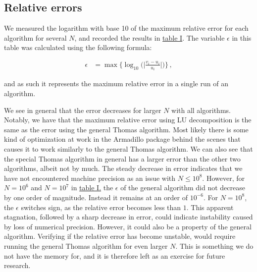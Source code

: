 \documentclass[english,notitlepage,reprint,nofootinbib]{revtex4-1}  %
\begin{document}
\subsection{Relative errors} \label{subsec:IV:B}

We measured the logarithm with base 10 of the maximum relative error for each algorithm for several $N$, and recorded the results in \hyperref[table:iv:b:1]{table I}. The variable $\epsilon$ in this table was calculated using the following formula:

\begin{align*}
\epsilon &= \max\bigg\{\log_{10} \bigg( \bigg| \frac{v_i-u_i}{u_i} \bigg| \bigg)\bigg\} \, ,
\end{align*} 

and as such it represents the maximum relative error in a single run of an algorithm. 

We see in general that the error decreases for larger $N$ with all algorithms. Notably, we have that the maximum relative error using LU decomposition is the same as the error using the general Thomas algorithm. Most likely there is some kind of optimization at work in the Armadillo package behind the scenes that causes it to work similarly to the general Thomas algorithm. We can also see that the special Thomas algorithm in general has a larger error than the other two algorithms, albeit not by much. The steady decrease in error indicates that we have not encountered machine precision as an issue with $N \leq 10^8$. However, for \(N=10^{6}\) and \(N=10^{7}\) in \hyperref[table:iv:b:1]{table I.} the \(\epsilon\) of the general algorithm did not decrease by one order of magnitude. Instead it remains at an order of \(10^{-6}\). For \(N=10^{8}\), the \(\epsilon\) switches sign, as the relative error becomes less than \(1\). This apparent stagnation, followed by a sharp decrease in error, could indicate instability caused by loss of numerical precision. However, it could also be a property of the general algorithm. Verifying if the relative error has become unstable, would require running the general Thomas algorithm for even larger \(N\). This is something we do not have the memory for, and it is therefore left as an exercise for future research.
\end{document}
